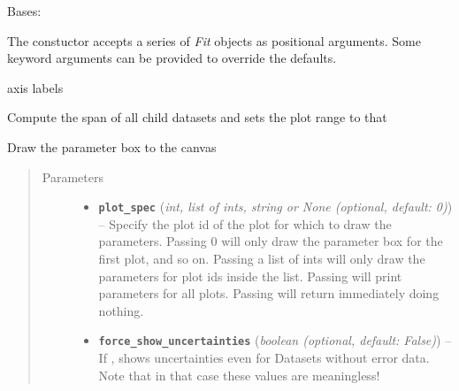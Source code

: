 \documentclass[a4paper,10pt,english]{sphinxmanual}
\begin{document}
\begin{fulllineitems}
\label{module_doc:kafe.plot.Plot}
Bases: 

The constuctor accepts a series of \emph{Fit} objects as positional
arguments. Some keyword arguments can be provided to override
the defaults.

\begin{fulllineitems}
\label{module_doc:kafe.plot.Plot.axis_labels}
axis labels

\end{fulllineitems}


\begin{fulllineitems}
\label{module_doc:kafe.plot.Plot.compute_plot_range}
Compute the span of all child datasets and sets the plot range to that

\end{fulllineitems}


\begin{fulllineitems}
\label{module_doc:kafe.plot.Plot.draw_fit_parameters_box}
Draw the parameter box to the canvas
\begin{quote}\begin{description}
\item[{Parameters}] \leavevmode\begin{itemize}
\item {} 
\textbf{\texttt{plot\_spec}} (\emph{int, list of ints, string or None (optional, default: 0)}) -- Specify the plot id of the plot for which to draw the parameters.
Passing 0 will only draw the parameter box for the first plot, and
so on. Passing a list of ints will only draw the parameters for
plot ids inside the list. Passing  will print parameters
for all plots. Passing  will return immediately doing
nothing.

\item {} 
\textbf{\texttt{force\_show\_uncertainties}} (\emph{boolean (optional, default: False)}) -- If , shows uncertainties even for Datasets without error
data. Note that in that case these values are meaningless!


\end{itemize}
\end{description}
\end{quote}
\end{fulllineitems}
\end{fulllineitems}
\end{document}
